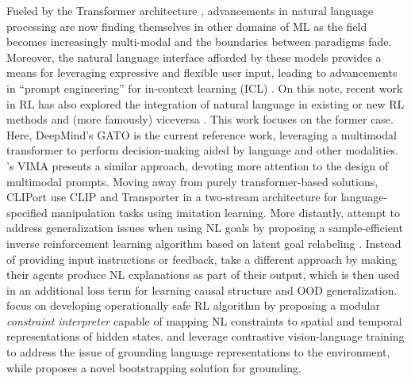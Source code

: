 \documentclass[../thesis-proposal/main.tex]{subfiles}
\begin{document}
Fueled by the Transformer architecture \citep{vaswani_attention_2017}, advancements in natural
language processing \citep{vaswani_attention_2017, devlin_bert_2019, brown_language_2020} are now
finding themselves in other domains of ML \citep{radford_learning_2021,
rombach_high-resolution_2022, dhariwal_jukebox_2020} as the field becomes increasingly multi-modal
\citep{baltrusaitis_multimodal_2019, xu_multimodal_2022} and the boundaries between paradigms fade.
Moreover, the natural language interface afforded by these models provides a means for leveraging
expressive and flexible user input, leading to advancements in ``prompt engineering'' for in-context
learning (ICL) \citep{dohan_language_2022, dosovitskiy_image_2022, reynolds_prompt_2021,
wei_chain--thought_2022, hertz_prompt--prompt_2022}. On this note, recent work in RL has also
explored the integration of natural language in existing or new RL methods
\citep{luketina_survey_2019} and (more famously) viceversa \citep{ouyang_training_2022}. This work
focuses on the former case. Here, DeepMind's GATO \citep{reed_generalist_2022} is the current
reference work, leveraging a multimodal transformer to perform decision-making aided by language and
other modalities. 's VIMA presents a similar approach, devoting more
attention to the design of multimodal prompts. Moving away from purely transformer-based solutions,
CLIPort \citep{shridhar_cliport_2021} use CLIP \citep{radford_learning_2021} and Transporter
\citep{zeng_transporter_2021} in a two-stream architecture for language-specified manipulation tasks
using imitation learning. More distantly, \citet{zhou_inverse_2021} attempt to address
generalization issues when using NL goals by proposing a sample-efficient inverse reinforcement
learning algorithm based on latent goal relabeling \citep{nair_visual_2018}. Instead of providing
input instructions or feedback, \citet{lampinen_tell_2022} take a different approach by making their
agents produce NL explanations as part of their output, which is then used in an additional loss
term for learning causal structure and OOD generalization.  focus on
developing operationally safe RL algorithm by proposing a modular \textit{constraint interpreter}
capable of mapping NL constraints to spatial and temporal representations of hidden states.
 and \citet{fan_minedojo_2022} leverage contrastive vision-language
training to address the issue of grounding language representations to the environment, while
\citet{watkins_teachable_2021} proposes a novel bootstrapping solution for grounding.
\end{document}
